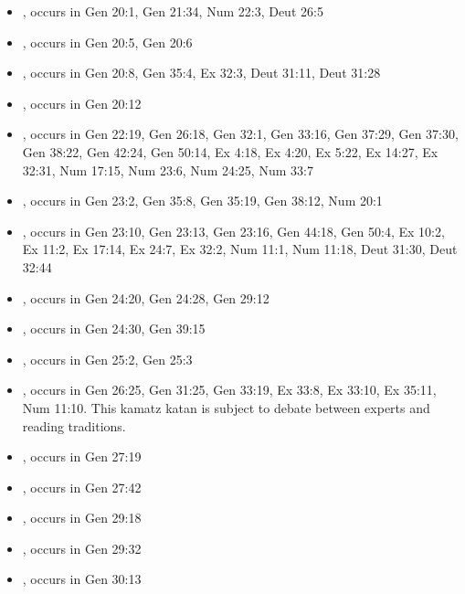 \documentclass[14pt]{article}
\begin{document}
\begin{itemize}
\item {}, occurs in Gen 20:1, Gen 21:34, Num 22:3, Deut 26:5

\item {}, occurs in Gen 20:5, Gen 20:6

\item {}, occurs in Gen 20:8, Gen 35:4, Ex 32:3, Deut 31:11, Deut 31:28

\item {}, occurs in Gen 20:12

\item {}, occurs in Gen 22:19, Gen 26:18, Gen 32:1, Gen 33:16, Gen 37:29, Gen 37:30, Gen 38:22, Gen 42:24, Gen 50:14, Ex 4:18, Ex 4:20, Ex 5:22, Ex 14:27, Ex 32:31, Num 17:15, Num 23:6, Num 24:25, Num 33:7

\item {}, occurs in Gen 23:2, Gen 35:8, Gen 35:19, Gen 38:12, Num 20:1

\item {}, occurs in Gen 23:10, Gen 23:13, Gen 23:16, Gen 44:18, Gen 50:4, Ex 10:2, Ex 11:2, Ex 17:14, Ex 24:7, Ex 32:2, Num 11:1, Num 11:18, Deut 31:30, Deut 32:44

\item {}, occurs in Gen 24:20, Gen 24:28, Gen 29:12

\item {}, occurs in Gen 24:30, Gen 39:15

\item {}, occurs in Gen 25:2, Gen 25:3

\item {}, occurs in Gen 26:25, Gen 31:25, Gen 33:19, Ex 33:8, Ex 33:10, Ex 35:11, Num 11:10. This kamatz katan is subject to debate between experts and reading traditions.

\item {}, occurs in Gen 27:19

\item {}, occurs in Gen 27:42

\item {}, occurs in Gen 29:18

\item {}, occurs in Gen 29:32

\item {}, occurs in Gen 30:13


\end{itemize}
\end{document}
